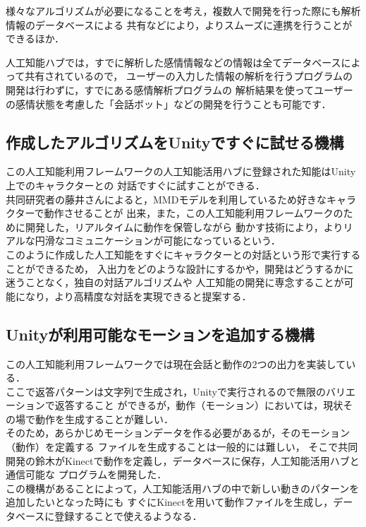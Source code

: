 様々なアルゴリズムが必要になることを考え，複数人で開発を行った際にも解析情報のデータベースによる
共有などにより，よりスムーズに連携を行うことができるほか．

人工知能ハブでは，すでに解析した感情情報などの情報は全てデータベースによって共有されているので，
ユーザーの入力した情報の解析を行うプログラムの開発は行わずに，すでにある感情解析プログラムの
解析結果を使ってユーザーの感情状態を考慮した「会話ボット」などの開発を行うことも可能です．\\
\subsection{作成したアルゴリズムをUnityですぐに試せる機構}
この人工知能利用フレームワークの人工知能活用ハブに登録された知能はUnity上でのキャラクターとの
対話ですぐに試すことができる．\\

共同研究者の藤井さんによると，MMDモデルを利用しているため好きなキャラクターで動作させることが
出来，また，この人工知能利用フレームワークのために開発した，リアルタイムに動作を保管しながら
動かす技術により，よりリアルな円滑なコミュニケーションが可能になっているという．\\

このように作成した人工知能をすぐにキャラクターとの対話という形で実行することができるため，
入出力をどのような設計にするかや，開発はどうするかに迷うことなく，独自の対話アルゴリズムや
人工知能の開発に専念することが可能になり，より高精度な対話を実現できると提案する．\\


\subsection{Unityが利用可能なモーションを追加する機構}
この人工知能利用フレームワークでは現在会話と動作の2つの出力を実装している．\\

ここで返答パターンは文字列で生成され，Unityで実行されるので無限のバリエーションで返答すること
ができるが，動作（モーション）においては，現状その場で動作を生成することが難しい．\\

そのため，あらかじめモーションデータを作る必要があるが，そのモーション（動作）を定義する
ファイルを生成することは一般的には難しい，
そこで共同開発の鈴木がKinectで動作を定義し，データベースに保存，人工知能活用ハブと通信可能な
プログラムを開発した．\\

この機構があることによって，人工知能活用ハブの中で新しい動きのパターンを追加したいとなった時にも
すぐにKinectを用いて動作ファイルを生成し，データベースに登録することで使えるようなる．

